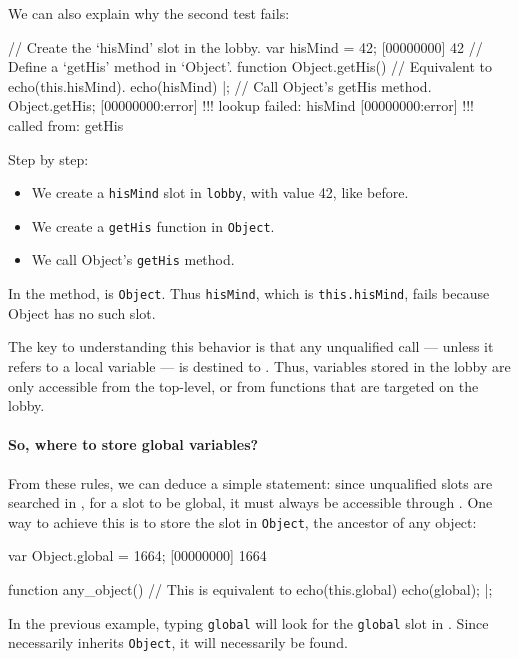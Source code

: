 We can also explain why the second test fails:

\begin{urbiscript}
// Create the `hisMind' slot in the lobby.
var hisMind = 42;
[00000000] 42
// Define a `getHis' method in `Object'.
function Object.getHis()
{
  // Equivalent to echo(this.hisMind).
  echo(hisMind)
}|;
// Call Object's getHis method.
Object.getHis;
[00000000:error] !!! lookup failed: hisMind
[00000000:error] !!!    called from: getHis
\end{urbiscript}

Step by step:
\begin{itemize}
\item We create a \lstinline|hisMind| slot in \lstinline|lobby|, with
  value 42, like before.
\item We create a \lstinline|getHis| function in \lstinline|Object|.
\item We call Object's \lstinline|getHis| method.
\end{itemize}

In the method, \this is \lstinline|Object|. Thus
\lstinline|hisMind|, which is \lstinline|this.hisMind|, fails because
Object has no such slot.

The key to understanding this behavior is that any unqualified call
--- unless it refers to a local variable --- is destined to
\this. Thus, variables stored in the lobby are only
accessible from the top-level, or from functions that are targeted on
the lobby.

\paragraph{So, where to store global variables?}
From these rules, we can deduce a simple statement: since unqualified
slots are searched in \this, for a slot to be global, it
must always be accessible through \this. One way to achieve
this is to store the slot in \lstinline|Object|, the ancestor of any
object:

\begin{urbiscript}
var Object.global = 1664;
[00000000] 1664

function any_object()
{
  // This is equivalent to echo(this.global)
  echo(global);
}|;
\end{urbiscript}

In the previous example, typing \lstinline|global| will look for the
\lstinline|global| slot in \this. Since \this
necessarily inherits \lstinline|Object|, it will necessarily be found.

